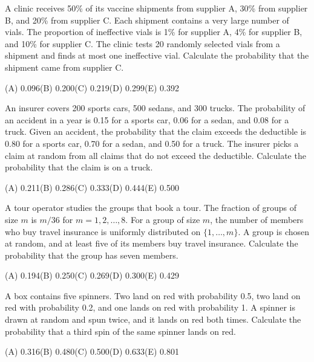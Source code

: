 \begin{practice}
A clinic receives 50\% of its vaccine shipments from supplier A, 30\% from supplier B, and
20\% from supplier C. Each shipment contains a very large number of vials. The proportion of
ineffective vials is 1\% for supplier A, 4\% for supplier B, and 10\% for supplier C. The
clinic tests 20 randomly selected vials from a shipment and finds at most one ineffective
vial. Calculate the probability that the shipment came from supplier C.
\par\smallskip\noindent (A) 0.096\qquad (B) 0.200\qquad (C) 0.219\qquad (D) 0.299\qquad (E) 0.392
\end{practice}

\begin{practice}
An insurer covers 200 sports cars, 500 sedans, and 300 trucks. The probability of an
accident in a year is 0.15 for a sports car, 0.06 for a sedan, and 0.08 for a truck. Given
an accident, the probability that the claim exceeds the deductible is 0.80 for a sports car,
0.70 for a sedan, and 0.50 for a truck. The insurer picks a claim at random from all claims
that do not exceed the deductible. Calculate the probability that the claim is on a truck.
\par\smallskip\noindent (A) 0.211\qquad (B) 0.286\qquad (C) 0.333\qquad (D) 0.444\qquad (E) 0.500
\end{practice}

\begin{practice}
A tour operator studies the groups that book a tour. The fraction of groups of size $m$ is
$m/36$ for $m = 1, 2, \dots, 8$. For a group of size $m$, the number of members who buy
travel insurance is uniformly distributed on $\{1, \dots, m\}$. A group is chosen at random,
and at least five of its members buy travel insurance. Calculate the probability that the
group has seven members.
\par\smallskip\noindent (A) 0.194\qquad (B) 0.250\qquad (C) 0.269\qquad (D) 0.300\qquad (E) 0.429
\end{practice}

\begin{practice}
A box contains five spinners. Two land on red with probability 0.5, two land on red with
probability 0.2, and one lands on red with probability 1. A spinner is drawn at random and
spun twice, and it lands on red both times. Calculate the probability that a third spin of
the same spinner lands on red.
\par\smallskip\noindent (A) 0.316\qquad (B) 0.480\qquad (C) 0.500\qquad (D) 0.633\qquad (E) 0.801
\end{practice}

